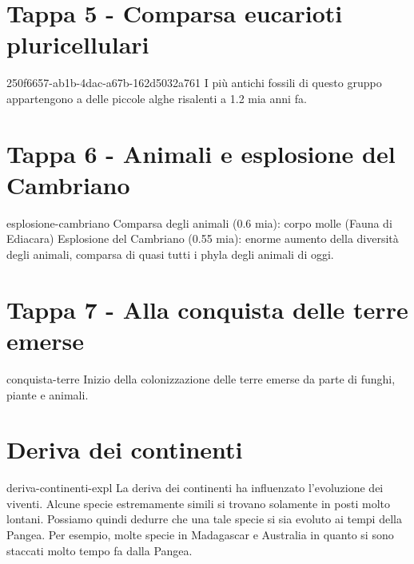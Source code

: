 \documentclass[preview]{standalone}
\begin{document}
\section{Tappa 5 - Comparsa eucarioti pluricellulari}

\begin{snippet}{250f6657-ab1b-4dac-a67b-162d5032a761}
    I più antichi fossili di questo gruppo appartengono a delle
    piccole alghe risalenti a 1.2 mia anni fa.
\end{snippet}

\section{Tappa 6 - Animali e esplosione del Cambriano}

\begin{snippet}{esplosione-cambriano}
    Comparsa degli animali (0.6 mia): corpo molle (Fauna di Ediacara)
    Esplosione del Cambriano (0.55 mia): enorme aumento della diversità
    degli animali, comparsa di quasi tutti i phyla degli animali di oggi.
\end{snippet}

\section{Tappa 7 - Alla conquista delle terre emerse}

\begin{snippet}{conquista-terre}
    Inizio della colonizzazione delle terre emerse da parte
    di funghi, piante e animali.
\end{snippet}

\section{Deriva dei continenti}

\begin{snippet}{deriva-continenti-expl}
    La deriva dei continenti ha influenzato l'evoluzione dei viventi.
    Alcune specie estremamente simili si trovano solamente in posti molto lontani.
    Possiamo quindi dedurre che una tale specie si sia evoluto ai tempi della Pangea.
    Per esempio, molte specie in Madagascar e Australia in quanto si sono staccati
    molto tempo fa dalla Pangea.
\end{snippet}

\end{document}
